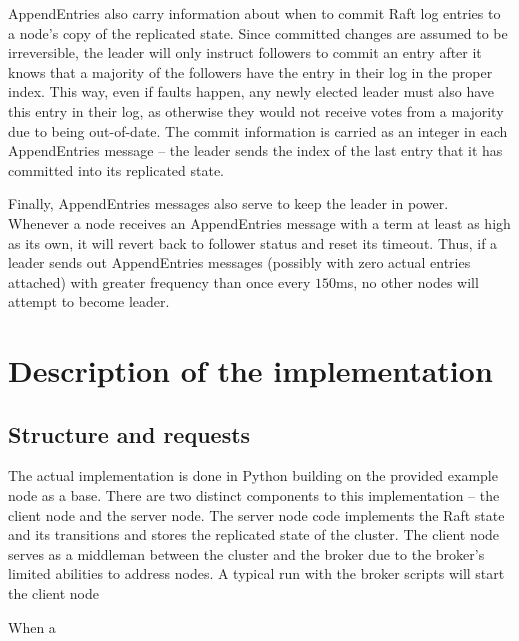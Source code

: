 \documentclass[psamsfonts]{amsart}
\begin{document}
AppendEntries also carry information about when to commit Raft log entries to a node's copy of the replicated state. Since committed changes are assumed to be irreversible, the leader will only instruct followers to commit an entry after it knows that a majority of the followers have the entry in their log in the proper index. This way, even if faults happen, any newly elected leader must also have this entry in their log, as otherwise they would not receive votes from a majority due to being out-of-date. The commit information is carried as an integer in each AppendEntries message -- the leader sends the index of the last entry that it has committed into its replicated state.

Finally, AppendEntries messages also serve to keep the leader in power. Whenever a node receives an AppendEntries message with a term at least as high as its own, it will revert back to follower status and reset its timeout. Thus, if a leader sends out AppendEntries messages (possibly with zero actual entries attached) with greater frequency than once every $150$ms, no other nodes will attempt to become leader.
\section{Description of the implementation}
\subsection{Structure and requests}
The actual implementation is done in Python building on the provided example node as a base. There are two distinct components to this implementation -- the client node and the server node. The server node code implements the Raft state and its transitions and stores the replicated state of the cluster. The client node serves as a middleman between the cluster and the broker due to the broker's limited abilities to address nodes. A typical run with the broker scripts will start the client node

When a 
\end{document}
